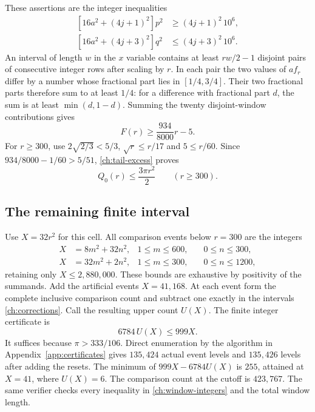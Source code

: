 \documentclass[11pt,reqno]{amsart}
\numberwithin{equation}{section}
\begin{document}
These assertions are the integer inequalities
\begin{equation}\label{ch:window-integers}
 \begin{split}
 [16a^2+(4j+1)^2]p^2&\ge(4j+1)^2\,10^6,\\
 [16a^2+(4j+3)^2]q^2&\le(4j+3)^2\,10^6.
 \end{split}
\end{equation}
An interval of length $w$ in the $x$ variable contains at least
$rw/2-1$ disjoint pairs of consecutive integer rows after scaling
by $r$. In each pair the two values of $af_r$ differ by a number
whose fractional part lies in $[1/4,3/4]$. Their two fractional
parts therefore sum to at least $1/4$: for a difference with
fractional part $d$, the sum is at least $\min(d,1-d)$.
Summing the twenty disjoint-window contributions gives
\begin{equation}\label{ch:loss}
 F(r)\ge\frac{934}{8000}r-5.
\end{equation}
For $r\ge300$, use $2\sqrt{2/3}<5/3$, $\sqrt r\le r/17$
and $5\le r/60$. Since
$934/8000-1/60>5/51$, \eqref{ch:tail-excess} proves
\begin{equation}\label{ch:tail}
 Q_0(r)\le\frac{3\pi r^2}{2}\qquad(r\ge300).
\end{equation}

\subsection{The remaining finite interval}

Use $X=32r^2$ for this cell. All comparison events below $r=300$
are the integers
\begin{equation}\label{ch:events}
 \begin{aligned}
 X&=8m^2+32n^2,&1\le m\le600,&\quad0\le n\le300,\\
 X&=32m^2+2n^2,&1\le m\le300,&\quad0\le n\le1200,
 \end{aligned}
\end{equation}
retaining only $X\le2{,}880{,}000$. These bounds are exhaustive
by positivity of the summands. Add the artificial events $X=41,168$.
At each event form the complete inclusive comparison count and
subtract one exactly in the intervals \eqref{ch:corrections}.
Call the resulting upper count $U(X)$. The finite integer certificate is
\begin{equation}\label{ch:integer}
 6784\,U(X)\le999X.
\end{equation}
It suffices because $\pi>333/106$. Direct enumeration by the
algorithm in Appendix~\ref{app:certificates} gives $135{,}424$
actual event levels and $135{,}426$ levels after adding the resets.
The minimum of $999X-6784U(X)$ is $255$, attained at $X=41$,
where $U(X)=6$. The comparison count at the cutoff is $423{,}767$.
The same verifier checks every inequality in
\eqref{ch:window-integers} and the total window length.
\end{document}
